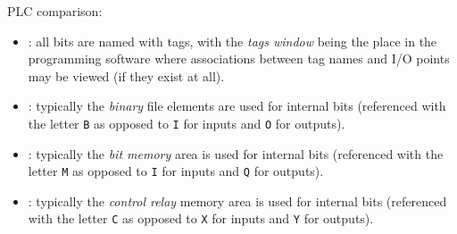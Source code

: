 \vfil 

\noindent
PLC comparison:

\begin{itemize}
\item{} : all bits are named with tags, with the {\it tags window} being the place in the programming software where associations between tag names and I/O points may be viewed (if they exist at all).
\vskip 5pt
\item{} : typically the {\it binary} file elements are used for internal bits (referenced with the letter {\tt B} as opposed to {\tt I} for inputs and {\tt O} for outputs).
\vskip 5pt
\item{} : typically the {\it bit memory} area is used for internal bits (referenced with the letter {\tt M} as opposed to {\tt I} for inputs and {\tt Q} for outputs).
\vskip 5pt
\item{} : typically the {\it control relay} memory area is used for internal bits (referenced with the letter {\tt C} as opposed to {\tt X} for inputs and {\tt Y} for outputs).
\end{itemize}

\eject

















